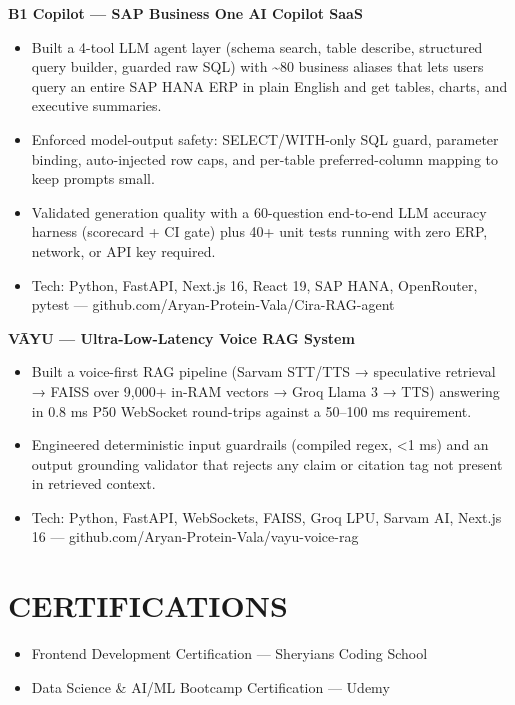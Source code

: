 \documentclass[9pt]{article}
\begin{document}
\textbf{B1 Copilot  ---  SAP Business One AI Copilot SaaS}
\vspace{1pt}
\begin{itemize}[leftmargin=11pt,itemsep=0pt,topsep=1pt,parsep=0pt]
\item Built a 4-tool LLM agent layer (schema search, table describe, structured query builder, guarded raw SQL) with \textasciitilde{}80 business aliases that lets users query an entire SAP HANA ERP in plain English and get tables, charts, and executive summaries.
\item Enforced model-output safety: SELECT/WITH-only SQL guard, parameter binding, auto-injected row caps, and per-table preferred-column mapping to keep prompts small.
\item Validated generation quality with a 60-question end-to-end LLM accuracy harness (scorecard + CI gate) plus 40+ unit tests running with zero ERP, network, or API key required.
\item Tech: Python, FastAPI, Next.js 16, React 19, SAP HANA, OpenRouter, pytest  ---  github.com/Aryan-Protein-Vala/Cira-RAG-agent
\end{itemize}
\textbf{VĀYU  ---  Ultra-Low-Latency Voice RAG System}
\vspace{1pt}
\begin{itemize}[leftmargin=11pt,itemsep=0pt,topsep=1pt,parsep=0pt]
\item Built a voice-first RAG pipeline (Sarvam STT/TTS → speculative retrieval → FAISS over 9,000+ in-RAM vectors → Groq Llama 3 → TTS) answering in 0.8 ms P50 WebSocket round-trips against a 50–100 ms requirement.
\item Engineered deterministic input guardrails (compiled regex, <1 ms) and an output grounding validator that rejects any claim or citation tag not present in retrieved context.
\item Tech: Python, FastAPI, WebSockets, FAISS, Groq LPU, Sarvam AI, Next.js 16  ---  github.com/Aryan-Protein-Vala/vayu-voice-rag
\end{itemize}
\section*{CERTIFICATIONS}
\begin{itemize}[leftmargin=11pt,itemsep=0pt,topsep=1pt,parsep=0pt]
\item Frontend Development Certification  ---  Sheryians Coding School
\item Data Science \& AI/ML Bootcamp Certification  ---  Udemy
\end{itemize}
\end{document}
